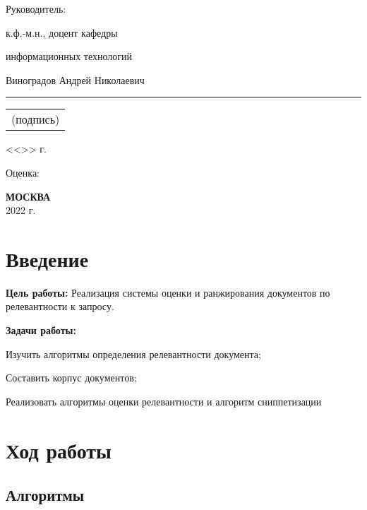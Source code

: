 \documentclass[a4page]{article}
\let\Oldsection\section
\renewcommand{\section}{\FloatBarrier\Oldsection}
\let\Oldsubsection\subsection
\renewcommand{\subsection}{\FloatBarrier\Oldsubsection}
\newcommand\signature{%
   \begin{minipage}[t]{5cm}
   \vspace*{1.5ex}  %
   \hrule
   \vspace{1mm} %
   \centering
   \begin{tabular}[t]{c}
   \small{(подпись)}
   \end{tabular}
   \end{minipage}}
\newcommand{\emptydate}{<<\underline{\phantom{99}}>> \underline{\phantom{февралиюня}} \the\year{} г.}
\begin{document}
\begin{titlepage}
\begin{adjustwidth}{0.6\textwidth}{0pt}
 \end{adjustwidth}
\begin{adjustwidth}{0.6\textwidth}{0pt}
Руководитель:
  
  к.ф.-м.н., доцент кафедры
  
  информационных технологий

  Виноградов Андрей Николаевич
  
\signature
\vspace{6pt}

\emptydate
\vspace{6pt}

Оценка: \hrulefill
  \end{adjustwidth}

 
\begin{center} \textbf{МОСКВА} \\ 2022 г. \end{center}
\thispagestyle{empty} %
 
\end{titlepage}

\newpage
     
 
\section{Введение}
\newcommand{\tpi}{$\pi$}

\textbf{Цель работы:} Реализация системы оценки и ранжирования документов по релевантности к запросу.

\textbf{Задачи работы:}

\begin{compactitem}
\item Изучить алгоритмы определения релевантности документа;
\item Составить корпус документов;
\item Реализовать алгоритмы оценки релевантности и алгоритм сниппетизации
\end{compactitem}

\tableofcontents

\section{Ход работы}

\subsection{Алгоритмы}
\end{document}

